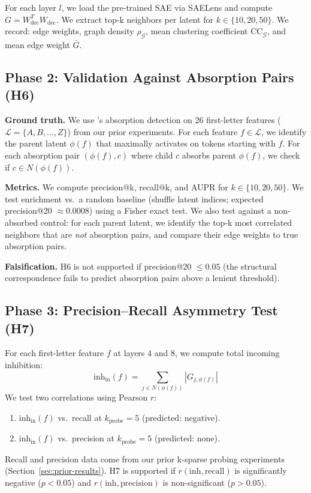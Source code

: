 \documentclass{article}
\begin{document}
For each layer $l$, we load the pre-trained SAE via SAELens and compute $G = W_{\text{dec}}^T W_{\text{dec}}$. We extract top-k neighbors per latent for $k \in \{10, 20, 50\}$. We record: edge weights, graph density $\rho_{\mathcal{G}}$, mean clustering coefficient $\text{CC}_{\mathcal{G}}$, and mean edge weight $\bar{G}$.

\subsection{Phase 2: Validation Against Absorption Pairs (H6)}

\textbf{Ground truth.} We use \citet{chanin2024quantifying}'s absorption detection on 26 first-letter features ($\mathcal{L} = \{A, B, \ldots, Z\}$) from our prior experiments. For each feature $f \in \mathcal{L}$, we identify the parent latent $\phi(f)$ that maximally activates on tokens starting with $f$. For each absorption pair $(\phi(f), c)$ where child $c$ absorbs parent $\phi(f)$, we check if $c \in N(\phi(f))$.

\textbf{Metrics.} We compute precision@k, recall@k, and AUPR for $k \in \{10, 20, 50\}$. We test enrichment vs.\ a random baseline (shuffle latent indices; expected precision@20 $\approx 0.0008$) using a Fisher exact test. We also test against a non-absorbed control: for each parent latent, we identify the top-k most correlated neighbors that are \textit{not} absorption pairs, and compare their edge weights to true absorption pairs.

\textbf{Falsification.} H6 is not supported if precision@20 $\leq 0.05$ (the structural correspondence fails to predict absorption pairs above a lenient threshold).

\subsection{Phase 3: Precision--Recall Asymmetry Test (H7)}

For each first-letter feature $f$ at layers 4 and 8, we compute total incoming inhibition:
\begin{equation}
\text{inh}_{\text{in}}(f) = \sum_{j \in N(\phi(f))} |G_{j, \phi(f)}|
\end{equation}
We test two correlations using Pearson $r$:
\begin{enumerate}
    \item $\text{inh}_{\text{in}}(f)$ vs.\ recall at $k_{\text{probe}} = 5$ (predicted: negative).
    \item $\text{inh}_{\text{in}}(f)$ vs.\ precision at $k_{\text{probe}} = 5$ (predicted: none).
\end{enumerate}
Recall and precision data come from our prior k-sparse probing experiments (Section~\ref{sec:prior-results}). H7 is supported if $r(\text{inh}, \text{recall})$ is significantly negative ($p < 0.05$) and $r(\text{inh}, \text{precision})$ is non-significant ($p > 0.05$).
\end{document}
